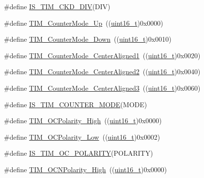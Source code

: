 \begin{DoxyCompactItemize}
\item 
\#define \hyperlink{group___t_i_m___clock___division___c_k_d_ga9298ec9ad2d578a4c54e6c0dd4c03946}{I\+S\+\_\+\+T\+I\+M\+\_\+\+C\+K\+D\+\_\+\+D\+IV}(D\+IV)
\item 
\#define \hyperlink{group___t_i_m___counter___mode_gaf4cd3ce74af3122507b77c8f6e79c832}{T\+I\+M\+\_\+\+Counter\+Mode\+\_\+\+Up}~((\hyperlink{_p_e___types_8h_a1f1825b69244eb3ad2c7165ddc99c956}{uint16\+\_\+t})0x0000)
\item 
\#define \hyperlink{group___t_i_m___counter___mode_gadd7c4200d185bdcd9e64ae80e6b200b0}{T\+I\+M\+\_\+\+Counter\+Mode\+\_\+\+Down}~((\hyperlink{_p_e___types_8h_a1f1825b69244eb3ad2c7165ddc99c956}{uint16\+\_\+t})0x0010)
\item 
\#define \hyperlink{group___t_i_m___counter___mode_gac07392e9637f8a0d115d4ba9a002ae93}{T\+I\+M\+\_\+\+Counter\+Mode\+\_\+\+Center\+Aligned1}~((\hyperlink{_p_e___types_8h_a1f1825b69244eb3ad2c7165ddc99c956}{uint16\+\_\+t})0x0020)
\item 
\#define \hyperlink{group___t_i_m___counter___mode_ga3793122e4c123a99e46fc2f04acea0d4}{T\+I\+M\+\_\+\+Counter\+Mode\+\_\+\+Center\+Aligned2}~((\hyperlink{_p_e___types_8h_a1f1825b69244eb3ad2c7165ddc99c956}{uint16\+\_\+t})0x0040)
\item 
\#define \hyperlink{group___t_i_m___counter___mode_ga65d9bc01ffa287cd7cf200d08c20a1ce}{T\+I\+M\+\_\+\+Counter\+Mode\+\_\+\+Center\+Aligned3}~((\hyperlink{_p_e___types_8h_a1f1825b69244eb3ad2c7165ddc99c956}{uint16\+\_\+t})0x0060)
\item 
\#define \hyperlink{group___t_i_m___counter___mode_ga9543fec190793e800d5d1b1b853636f5}{I\+S\+\_\+\+T\+I\+M\+\_\+\+C\+O\+U\+N\+T\+E\+R\+\_\+\+M\+O\+DE}(M\+O\+DE)
\item 
\#define \hyperlink{group___t_i_m___output___compare___polarity_gaba2f2de6fd722b8973e0eddeb8644022}{T\+I\+M\+\_\+\+O\+C\+Polarity\+\_\+\+High}~((\hyperlink{_p_e___types_8h_a1f1825b69244eb3ad2c7165ddc99c956}{uint16\+\_\+t})0x0000)
\item 
\#define \hyperlink{group___t_i_m___output___compare___polarity_ga9f4b11953dbd2c6f836b6913469dcf54}{T\+I\+M\+\_\+\+O\+C\+Polarity\+\_\+\+Low}~((\hyperlink{_p_e___types_8h_a1f1825b69244eb3ad2c7165ddc99c956}{uint16\+\_\+t})0x0002)
\item 
\#define \hyperlink{group___t_i_m___output___compare___polarity_ga1c2ee68d587d4f48d935c82fe4c3fe1e}{I\+S\+\_\+\+T\+I\+M\+\_\+\+O\+C\+\_\+\+P\+O\+L\+A\+R\+I\+TY}(P\+O\+L\+A\+R\+I\+TY)
\item 
\#define \hyperlink{group___t_i_m___output___compare___n___polarity_gaa62288888d4f6858bee6b3cd9086ae3f}{T\+I\+M\+\_\+\+O\+C\+N\+Polarity\+\_\+\+High}~((\hyperlink{_p_e___types_8h_a1f1825b69244eb3ad2c7165ddc99c956}{uint16\+\_\+t})0x0000)

\end{DoxyCompactItemize}
